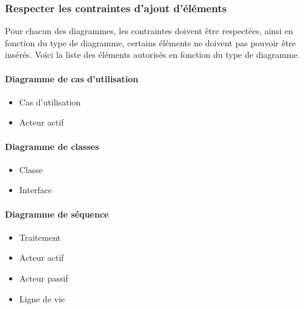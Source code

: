 \documentclass[12pt,a4paper,openany]{report}
\begin{document}
		\subsubsection{Respecter les contraintes d'ajout d'éléments}
		Pour chacun des diagrammes, les contraintes doivent être respectées, ainsi en fonction du type de diagramme, certains éléments ne doivent pas pouvoir
		être insérés. Voici la liste des éléments autorisés en fonction du type de diagramme.
		\begin{multicols}{2}
		\paragraph{Diagramme de cas d'utilisation}
		\begin{itemize}
			\item Cas d'utilisation
			\item Acteur actif
		\end{itemize}
		\paragraph{Diagramme de classes}
		\begin{itemize}
			\item Classe
			\item Interface
		\end{itemize}
		\paragraph{Diagramme de séquence}
		\begin{itemize}
			\item Traitement
			\item Acteur actif 
			\item Acteur passif
			\item Ligne de vie 
		\end{itemize}
		\end{multicols}
\end{document}
